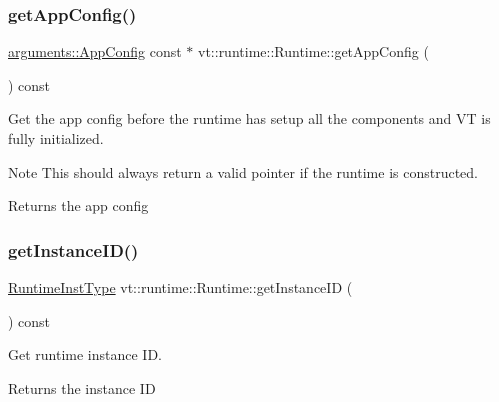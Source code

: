 \subsubsection{\texorpdfstring{get\+App\+Config()}{getAppConfig()}}
{\footnotesize\ttfamily \hyperlink{structvt_1_1arguments_1_1_app_config}{arguments\+::\+App\+Config} const  $\ast$ vt\+::runtime\+::\+Runtime\+::get\+App\+Config (\begin{DoxyParamCaption}{ }\end{DoxyParamCaption}) const}



Get the app config before the runtime has setup all the components and VT is fully initialized. 

\begin{DoxyNote}{Note}
This should always return a valid pointer if the runtime is constructed.
\end{DoxyNote}
\begin{DoxyReturn}{Returns}
the app config 
\end{DoxyReturn}
\mbox{\label{structvt_1_1runtime_1_1_runtime_a06400b91b766f83d4b630bdc9ed840b1}} 
\subsubsection{\texorpdfstring{get\+Instance\+I\+D()}{getInstanceID()}}
{\footnotesize\ttfamily \hyperlink{namespacevt_1_1runtime_afca910c1b38b3975f7c1da8001a77d58}{Runtime\+Inst\+Type} vt\+::runtime\+::\+Runtime\+::get\+Instance\+ID (\begin{DoxyParamCaption}{ }\end{DoxyParamCaption}) const\hspace{0.3cm}{\ttfamily [inline]}}



Get runtime instance ID. 

\begin{DoxyReturn}{Returns}
the instance ID 
\end{DoxyReturn}
\mbox{\label{structvt_1_1runtime_1_1_runtime_ae0f66c530a72122874079b52fb259dfb}} 
